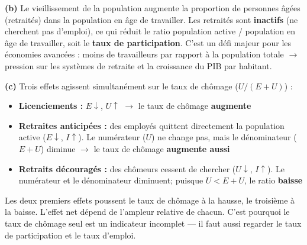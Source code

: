 \begin{reponse}
\textbf{(b)} Le vieillissement de la population augmente la proportion de personnes âgées (retraités) dans la population en âge de travailler. Les retraités sont \textbf{inactifs} (ne cherchent pas d'emploi), ce qui réduit le ratio population active / population en âge de travailler, soit le \textbf{taux de participation}. C'est un défi majeur pour les économies avancées : moins de travailleurs par rapport à la population totale $\to$ pression sur les systèmes de retraite et la croissance du PIB par habitant.
\end{reponse}


\begin{reponse}
\textbf{(c)} Trois effets agissent simultanément sur le taux de chômage ($U/(E+U)$) :
\begin{itemize}
   \item \textbf{Licenciements :} $E \downarrow$, $U \uparrow$ $\to$ le taux de chômage \textbf{augmente}
   \item \textbf{Retraites anticipées :} des employés quittent directement la population active ($E \downarrow$, $I \uparrow$). Le numérateur ($U$) ne change pas, mais le dénominateur ($E + U$) diminue $\to$ le taux de chômage \textbf{augmente aussi}
   \item \textbf{Retraits découragés :} des chômeurs cessent de chercher ($U \downarrow$, $I \uparrow$). Le numérateur et le dénominateur diminuent; puisque $U < E + U$, le ratio \textbf{baisse}
\end{itemize}
Les deux premiers effets poussent le taux de chômage à la hausse, le troisième à la baisse. L'effet net dépend de l'ampleur relative de chacun. C'est pourquoi le taux de chômage seul est un indicateur incomplet --- il faut aussi regarder le taux de participation et le taux d'emploi.
\end{reponse}

